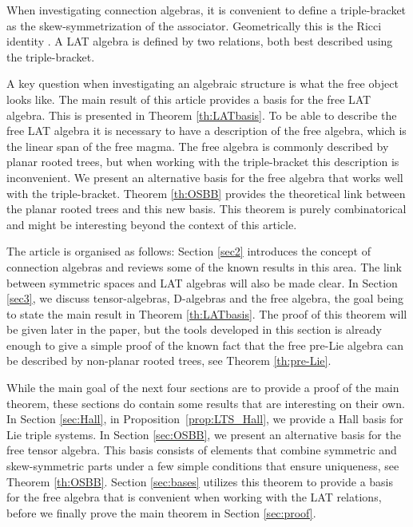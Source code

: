 \documentclass[10pt,a4paper]{amsart}
\numberwithin{equation}{section}
\begin{document}
When investigating connection algebras, it is convenient to define a triple-bracket as the skew-symmetrization of the associator. Geometrically this is the Ricci identity \cite{Ricci_1900}. A LAT algebra is defined by two relations, both best described using the triple-bracket.

A key question when investigating an algebraic structure is what the free object looks like. The main result of this article provides a basis for the free LAT algebra. This is presented in Theorem \ref{th:LATbasis}. To be able to describe the free LAT algebra it is necessary to have a description of the free algebra, which is the linear span of the free magma. The free algebra is commonly described by planar rooted trees, but when working with the triple-bracket this description is inconvenient. We present an alternative basis for the free algebra that works well with the triple-bracket. Theorem \ref{th:OSBB} provides the theoretical link between the planar rooted trees and this new basis. This theorem is purely combinatorical and might be interesting beyond the context of this article.

The article is organised as follows: Section \ref{sec2} introduces the concept of connection algebras and reviews some of the known results in this area. The link between symmetric spaces and LAT algebras will also be made clear. In Section \ref{sec3}, we discuss tensor-algebras, D-algebras and the free algebra, the goal being to state the main result in Theorem \ref{th:LATbasis}. The proof of this theorem will be given later in the paper, but the tools developed in this section is already enough to give a simple proof of the known fact that the free pre-Lie algebra can be described by non-planar rooted trees, see Theorem \ref{th:pre-Lie}.

While the main goal of the next four sections are to provide a proof of the main theorem, these sections do contain some results that are interesting on their own. In Section \ref{sec:Hall}, in Proposition~\ref{prop:LTS_Hall}, we provide a Hall basis for Lie triple systems. In Section \ref{sec:OSBB}, we present an alternative basis for the free tensor algebra. This basis consists of elements that combine symmetric and skew-symmetric parts under a few simple conditions that ensure uniqueness, see Theorem \ref{th:OSBB}. Section \ref{sec:bases} utilizes this theorem to provide a basis for the free algebra that is convenient when working with the LAT relations, before we finally prove the main theorem in Section \ref{sec:proof}.
\end{document}
